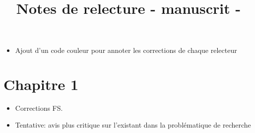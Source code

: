 \documentclass[a4paper,oneside,11pt]{article}
\title{Notes de relecture - manuscrit - }
\author{}
\date{}
\begin{document}
\maketitle

\begin{itemize}
    \item{Ajout d'un code couleur pour annoter les corrections de chaque relecteur}
\end{itemize}

\section{Chapitre 1}

\begin{itemize}
    \item{Corrections FS.}
    \item{Tentative: avis plus critique sur l'existant dans la problématique de recherche}
\end{itemize}
\end{document}
